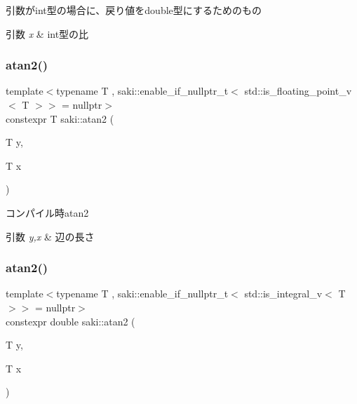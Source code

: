 引数がint型の場合に、戻り値をdouble型にするためのもの 


\begin{DoxyParams}{引数}
{\em x} & int型の比 \\
\hline
\end{DoxyParams}
\mbox{\label{namespacesaki_ac528a4ab6013623bfe6257229e302015}} 
\subsubsection{\texorpdfstring{atan2()}{atan2()}\hspace{0.1cm}{\footnotesize\ttfamily [1/3]}}
{\footnotesize\ttfamily template$<$typename T , saki\+::enable\+\_\+if\+\_\+nullptr\+\_\+t$<$ std\+::is\+\_\+floating\+\_\+point\+\_\+v$<$ T $>$$>$  = nullptr$>$ \\
constexpr T saki\+::atan2 (\begin{DoxyParamCaption}\item[{T}]{y,  }\item[{T}]{x }\end{DoxyParamCaption})}



コンパイル時atan2 


\begin{DoxyParams}{引数}
{\em y,x} & 辺の長さ \\
\hline
\end{DoxyParams}
\mbox{\label{namespacesaki_a1f8c6dc6223b790f6d227c8d22cf8b86}} 
\subsubsection{\texorpdfstring{atan2()}{atan2()}\hspace{0.1cm}{\footnotesize\ttfamily [2/3]}}
{\footnotesize\ttfamily template$<$typename T , saki\+::enable\+\_\+if\+\_\+nullptr\+\_\+t$<$ std\+::is\+\_\+integral\+\_\+v$<$ T $>$$>$  = nullptr$>$ \\
constexpr double saki\+::atan2 (\begin{DoxyParamCaption}\item[{T}]{y,  }\item[{T}]{x }\end{DoxyParamCaption})}



